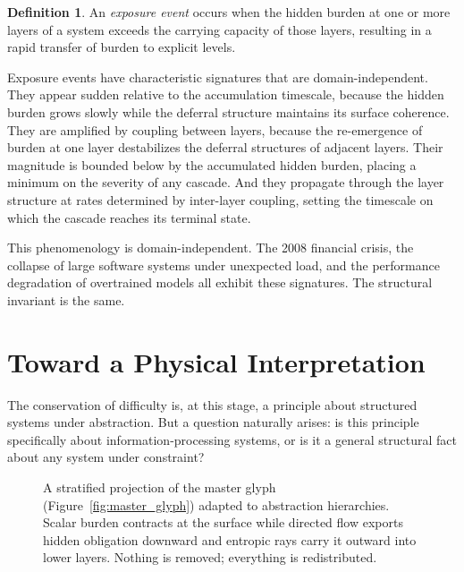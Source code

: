 \documentclass[12pt,a4paper,openany]{book}
\theoremstyle{plain}
\theoremstyle{definition}
\newtheorem{definition}[theorem]{Definition}
\theoremstyle{remark}
\newcommand{\RSVPLayeredGlyph}{%
  \draw[rsvp boundary] (-2,0) rectangle (2,4.2);
  \draw[rsvp ghost] (-2,1.4) -- (2,1.4);
  \draw[rsvp ghost] (-2,2.8) -- (2,2.8);
  \draw[rsvp scalar] (-1.4,3.5) ellipse (0.9 and 0.35);
  \draw[rsvp scalar] (-1.4,3.5) ellipse (0.55 and 0.20);
  \draw[rsvp flow]   (-1.4,3.1) -- (-1.4,2.1);
  \draw[rsvp flow]   (-1.4,1.7) -- (-1.4,0.7);
  \draw[rsvp entropy] (0.9,3.55) -- (1.45,2.9);
  \draw[rsvp entropy] (1.0,2.15) -- (1.55,1.5);
  \draw[rsvp entropy] (1.1,0.75) -- (1.65,0.15);}
\begin{document}
\begin{definition}
An \emph{exposure event} occurs when the hidden burden at one or more layers of a system exceeds the carrying capacity of those layers, resulting in a rapid transfer of burden to explicit levels.
\end{definition}

Exposure events have characteristic signatures that are domain-independent. They appear sudden relative to the accumulation timescale, because the hidden burden grows slowly while the deferral structure maintains its surface coherence. They are amplified by coupling between layers, because the re-emergence of burden at one layer destabilizes the deferral structures of adjacent layers. Their magnitude is bounded below by the accumulated hidden burden, placing a minimum on the severity of any cascade. And they propagate through the layer structure at rates determined by inter-layer coupling, setting the timescale on which the cascade reaches its terminal state.

This phenomenology is domain-independent. The 2008 financial crisis, the collapse of large software systems under unexpected load, and the performance degradation of overtrained models all exhibit these signatures. The structural invariant is the same.

\section{Toward a Physical Interpretation}

The conservation of difficulty is, at this stage, a principle about structured systems under abstraction. But a question naturally arises: is this principle specifically about information-processing systems, or is it a general structural fact about any system under constraint?

\begin{figure}[h]
\centering
{}
\caption[Layered glyph, Chapter~2: conservation of difficulty]{A stratified projection of the master glyph (Figure~\ref{fig:master_glyph}) adapted to abstraction hierarchies. Scalar burden contracts at the surface while directed flow exports hidden obligation downward and entropic rays carry it outward into lower layers. Nothing is removed; everything is redistributed.}
\label{fig:glyph_layered}
\end{figure}
\end{document}
